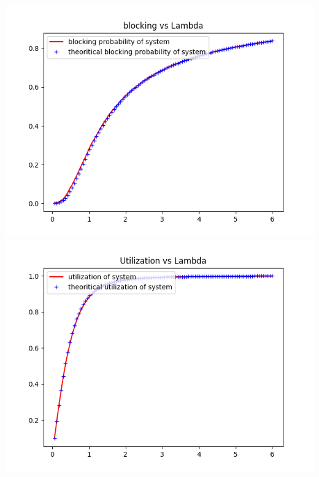 \documentclass[11pt]{article}
\begin{document}
 \includegraphics{BlockingProbability_L10_K4_M2_U3}
 \includegraphics{Utilization_L10_K4_M2_U3}
 
\end{document}
